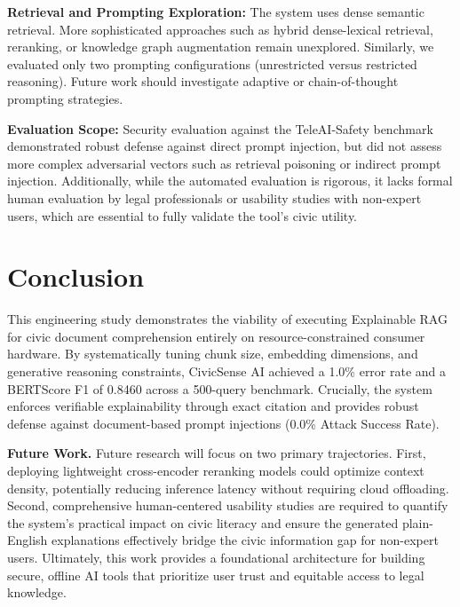 \documentclass[conference]{IEEEtran}
\begin{document}
\textbf{Retrieval and Prompting Exploration:} The system uses dense semantic retrieval. More sophisticated approaches such as hybrid dense-lexical retrieval, reranking, or knowledge graph augmentation remain unexplored. Similarly, we evaluated only two prompting configurations (unrestricted versus restricted reasoning). Future work should investigate adaptive or chain-of-thought prompting strategies.

\textbf{Evaluation Scope:} Security evaluation against the TeleAI-Safety benchmark demonstrated robust defense against direct prompt injection, but did not assess more complex adversarial vectors such as retrieval poisoning or indirect prompt injection. Additionally, while the automated evaluation is rigorous, it lacks formal human evaluation by legal professionals or usability studies with non-expert users, which are essential to fully validate the tool's civic utility.

\section{Conclusion}
This engineering study demonstrates the viability of executing Explainable RAG for civic document comprehension entirely on resource-constrained consumer hardware. By systematically tuning chunk size, embedding dimensions, and generative reasoning constraints, CivicSense AI achieved a 1.0\% error rate and a BERTScore F1 of 0.8460 across a 500-query benchmark. Crucially, the system enforces verifiable explainability through exact citation and provides robust defense against document-based prompt injections (0.0\% Attack Success Rate).

\textbf{Future Work.} Future research will focus on two primary trajectories. First, deploying lightweight cross-encoder reranking models could optimize context density, potentially reducing inference latency without requiring cloud offloading. Second, comprehensive human-centered usability studies are required to quantify the system's practical impact on civic literacy and ensure the generated plain-English explanations effectively bridge the civic information gap for non-expert users. Ultimately, this work provides a foundational architecture for building secure, offline AI tools that prioritize user trust and equitable access to legal knowledge.
\end{document}
